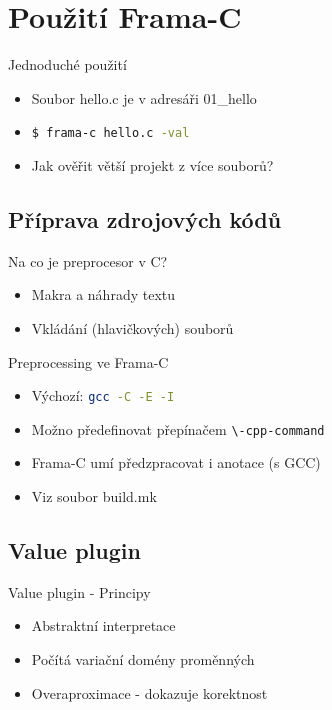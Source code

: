 \documentclass[11pt]{beamer}
\begin{document}
\section{Použití Frama-C}

\begin{frame}{Jednoduché použití}
\begin{itemize}
	\item Soubor hello.c je v adresáři 01\_hello
	\item \lstinline[language=bash]{$ frama-c hello.c -val}
	\item Jak ověřit větší projekt z více souborů?
\end{itemize}
\end{frame}


\subsection{Příprava zdrojových kódů}

\begin{frame}{Na co je preprocesor v C?}
\begin{itemize}
	\pause \item Makra a náhrady textu
	\pause \item Vkládání (hlavičkových) souborů
\end{itemize}
\end{frame}

\begin{frame}{Preprocessing ve Frama-C}
\begin{itemize}
	\item Výchozí: \lstinline[language=bash]{gcc -C -E -I}
	\item Možno předefinovat přepínačem \lstinline[language=bash]{\-cpp-command}
	\item Frama-C umí předzpracovat i anotace (s GCC)
	\item Viz soubor build.mk
\end{itemize}
\end{frame}

\subsection{Value plugin}

\begin{frame}{Value plugin - Principy}
	\begin{itemize}
			\item Abstraktní interpretace
			\item Počítá variační domény proměnných
			\item Overaproximace - dokazuje korektnost
	\end{itemize}
\end{frame}
\end{document}
